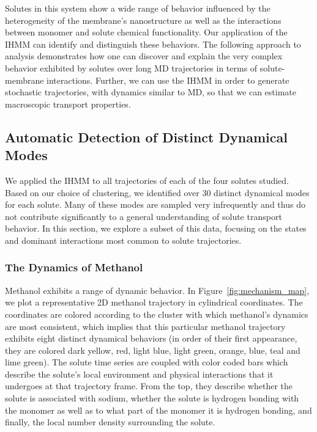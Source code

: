 \documentclass[journal=jpcbfk,manuscript=article]{achemso}
\begin{document}
  Solutes in this system show a wide range of behavior influenced by the 
  heterogeneity of the membrane's nanostructure as well as the interactions 
  between monomer and solute chemical functionality. Our application of the 
  IHMM can identify and distinguish these behaviors. The following approach 
  to analysis demonstrates how one can discover and explain the very complex
  behavior exhibited by solutes over long MD trajectories in terms of 
  solute-membrane interactions. Further, we can use the IHMM in order to generate
  stochastic trajectories, with dynamics similar to MD, so that we can estimate 
  macroscopic transport properties. 	

  \subsection{Automatic Detection of Distinct Dynamical Modes}\label{section:find_modes}
  
  We applied the IHMM to all trajectories of each of the four solutes studied.
  Based on our choice of clustering, we identified over 30 distinct dynamical
  modes for each solute. Many of these modes are sampled very infrequently and thus
  do not contribute significantly to a general understanding of solute transport behavior.
  In this section, we explore a subset of this data, focusing on the states
  and dominant interactions most common to solute trajectories.

  \subsubsection*{The Dynamics of Methanol}
  
  Methanol exhibits a range of dynamic behavior. In Figure~\ref{fig:mechanism_map}, we
  plot a representative 2D methanol trajectory in cylindrical coordinates. The coordinates
  are colored according to the cluster with which methanol's dynamics are most consistent,
  which implies that this particular methanol trajectory exhibits eight distinct dynamical 
  behaviors (in order of their first appearance, they are colored dark yellow, red, light
  blue, light green, orange, blue, teal and lime green). The solute time series are coupled
  with color coded bars which describe the solute's local environment and physical 
  interactions that it undergoes at that trajectory frame. From the top, they describe 
  whether the solute is associated with sodium, whether the solute is hydrogen bonding
  with the monomer as well as to what part of the monomer it is hydrogen bonding, and 
  finally, the local number density surrounding the solute. 
\end{document}
